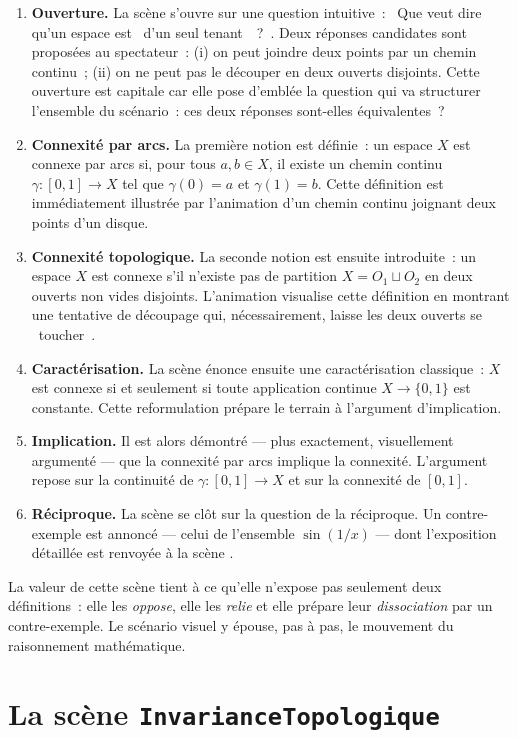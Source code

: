 \documentclass[12pt, a4paper, openany]{report}
\begin{document}
	\begin{enumerate}
		\item \textbf{Ouverture.} La scène s’ouvre sur une question intuitive~: \og~Que veut dire qu’un espace est \og~d’un seul tenant~\fg~?~\fg. Deux réponses candidates sont proposées au spectateur~: (i) on peut joindre deux points par un chemin continu~; (ii) on ne peut pas le découper en deux ouverts disjoints. Cette ouverture est capitale car elle pose d’emblée la question qui va structurer l’ensemble du scénario~: ces deux réponses sont-elles équivalentes~?
		\item \textbf{Connexité par arcs.} La première notion est définie~: un espace $X$ est connexe par arcs si, pour tous $a,b\in X$, il existe un chemin continu $\gamma:[0,1]\to X$ tel que $\gamma(0)=a$ et $\gamma(1)=b$. Cette définition est immédiatement illustrée par l’animation d’un chemin continu joignant deux points d’un disque.
		\item \textbf{Connexité topologique.} La seconde notion est ensuite introduite~: un espace $X$ est connexe s’il n’existe pas de partition $X=O_1\sqcup O_2$ en deux ouverts non vides disjoints. L’animation visualise cette définition en montrant une tentative de découpage qui, nécessairement, laisse les deux ouverts se \og~toucher~\fg.
		\item \textbf{Caractérisation.} La scène énonce ensuite une caractérisation classique~: $X$ est connexe si et seulement si toute application continue $X\to\{0,1\}$ est constante. Cette reformulation prépare le terrain à l’argument d’implication.
		\item \textbf{Implication.} Il est alors démontré — plus exactement, visuellement argumenté — que la connexité par arcs implique la connexité. L’argument repose sur la continuité de $\gamma:[0,1]\to X$ et sur la connexité de $[0,1]$.
		\item \textbf{Réciproque.} La scène se clôt sur la question de la réciproque. Un contre-exemple est annoncé — celui de l’ensemble $\sin(1/x)$ — dont l’exposition détaillée est renvoyée à la scène .
	\end{enumerate}

	La valeur de cette scène tient à ce qu’elle n’expose pas seulement deux définitions~: elle les \emph{oppose}, elle les \emph{relie} et elle prépare leur \emph{dissociation} par un contre-exemple. Le scénario visuel y épouse, pas à pas, le mouvement du raisonnement mathématique.

	\section{La scène \texttt{InvarianceTopologique}}
\end{document}
